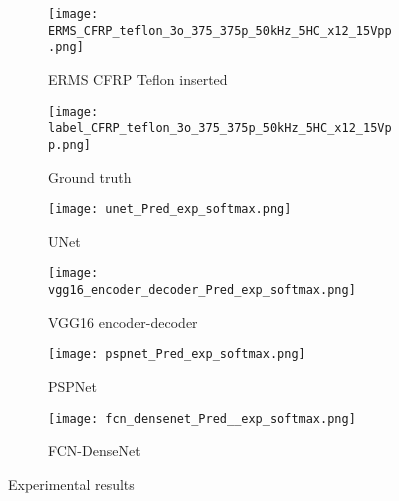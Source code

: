 \begin{figure} [!h]
	\centering
	\begin{subfigure}[b]{0.47\textwidth}
		\centering
		\texttt{[image: ERMS\_CFRP\_teflon\_3o\_375\_375p\_50kHz\_5HC\_x12\_15Vpp.png]}
		\caption{ERMS CFRP Teflon inserted}
		\label{fig:Delamination}
	\end{subfigure}			
	\hfill
	\begin{subfigure}[b]{0.47\textwidth}
		\centering 	
		\texttt{[image: label\_CFRP\_teflon\_3o\_375\_375p\_50kHz\_5HC\_x12\_15Vpp.png]}
		\caption{Ground truth} 
		\label{fig:damage_label}
	\end{subfigure}
	\hfill
	\begin{subfigure}[b]{0.47\textwidth}
		\centering
		\texttt{[image: unet\_Pred\_exp\_softmax.png]}
		\caption{UNet} 
		\label{fig:unet_exp_7_}
	\end{subfigure}
	\hfill
	\begin{subfigure}[b]{0.47\textwidth}
	\centering
	\texttt{[image: vgg16\_encoder\_decoder\_Pred\_exp\_softmax.png]}
	\caption{VGG16 encoder-decoder} 
	\label{fig:vgg16_exp_7_}
	\end{subfigure}
	\hfill
	\begin{subfigure}[b]{0.47\textwidth}
		\centering
		\texttt{[image: pspnet\_Pred\_exp\_softmax.png]}
		\caption{PSPNet} 
		\label{fig:pspnet_exp_7_}
	\end{subfigure}
	\hfill
	\begin{subfigure}[b]{0.47\textwidth}
		\centering
		\texttt{[image: fcn\_densenet\_Pred\_\_exp\_softmax.png]}
		\caption{FCN-DenseNet} 
		\label{fig:fcn_densenet_exp}
	\end{subfigure}
		\caption{Experimental results}
		\label{fig:Exp_ERMS_teflon}
	\end{figure}

